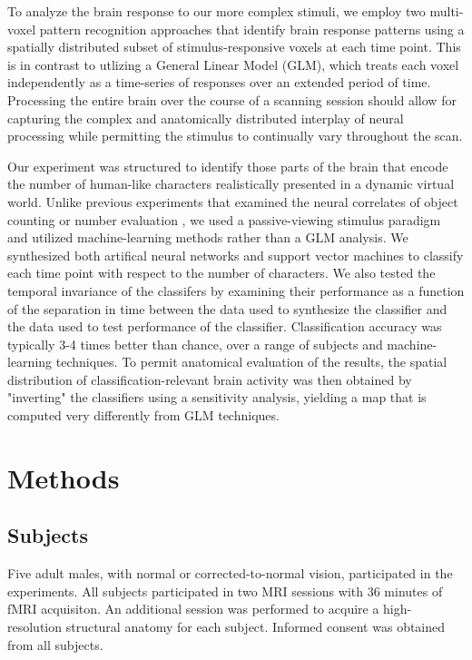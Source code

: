 \documentclass[preprint,5p,authoryear]{elsarticle}
\begin{document}
To analyze the brain response to our more complex stimuli, we employ two multi-voxel pattern recognition approaches that identify brain response patterns using a spatially distributed subset of stimulus-responsive voxels at each time point.
This is in contrast to utlizing a General Linear Model (GLM), which treats each voxel independently as a time-series of responses over an extended period of time.
Processing the entire brain over the course of a scanning session should allow for capturing the complex and anatomically distributed interplay of neural processing while permitting the stimulus to continually vary throughout the scan.

Our experiment was structured to identify those parts of the brain that encode the number of human-like characters realistically presented in a dynamic virtual world.
Unlike previous experiments that examined the neural correlates of object counting or number evaluation \citep{countingstuff}, we used a passive-viewing stimulus paradigm and utilized machine-learning methods rather than a GLM analysis.
We synthesized both artifical neural networks and support vector machines to classify each time point with respect to the number of characters.
We also tested the temporal invariance of the classifers by examining their performance as a function of the separation in time between the data used to synthesize the classifier and the data used to test performance of the classifier.
Classification accuracy was typically 3-4 times better than chance, over a range of subjects and machine-learning techniques.
To permit anatomical evaluation of the results, the spatial distribution of classification-relevant brain activity was then obtained by "inverting" the classifiers using a sensitivity analysis, yielding a map that is computed very differently from GLM  techniques.

\section{Methods}

\subsection{Subjects}
Five adult males, with normal or corrected-to-normal vision, participated in the experiments. 
All subjects participated in two MRI sessions with 36 minutes of fMRI acquisiton. 
An additional session was performed to acquire a high-resolution structural anatomy for each subject. 
Informed consent was obtained from all subjects.
\end{document}
